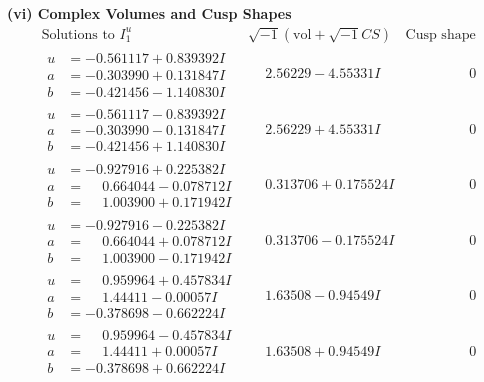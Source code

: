 \documentclass[1p]{elsarticle_modified}
\theoremstyle{definition}
\newcommand{\I}{\sqrt{-1}}
\begin{document}
\newpage\flushleft \textbf{(vi) Complex Volumes and Cusp Shapes}
$$\begin{array}{c|c|c}  
\text{Solutions to }I^u_{1}& \I (\text{vol} + \sqrt{-1}CS) & \text{Cusp shape}\\
 \hline 
\begin{aligned}
u &= -0.561117 + 0.839392 I \\
a &= -0.303990 + 0.131847 I \\
b &= -0.421456 - 1.140830 I\end{aligned}
 & \phantom{-}2.56229 - 4.55331 I & \phantom{-0.000000 } 0 \\ \hline\begin{aligned}
u &= -0.561117 - 0.839392 I \\
a &= -0.303990 - 0.131847 I \\
b &= -0.421456 + 1.140830 I\end{aligned}
 & \phantom{-}2.56229 + 4.55331 I & \phantom{-0.000000 } 0 \\ \hline\begin{aligned}
u &= -0.927916 + 0.225382 I \\
a &= \phantom{-}0.664044 - 0.078712 I \\
b &= \phantom{-}1.003900 + 0.171942 I\end{aligned}
 & \phantom{-}0.313706 + 0.175524 I & \phantom{-0.000000 } 0 \\ \hline\begin{aligned}
u &= -0.927916 - 0.225382 I \\
a &= \phantom{-}0.664044 + 0.078712 I \\
b &= \phantom{-}1.003900 - 0.171942 I\end{aligned}
 & \phantom{-}0.313706 - 0.175524 I & \phantom{-0.000000 } 0 \\ \hline\begin{aligned}
u &= \phantom{-}0.959964 + 0.457834 I \\
a &= \phantom{-}1.44411 - 0.00057 I \\
b &= -0.378698 - 0.662224 I\end{aligned}
 & \phantom{-}1.63508 - 0.94549 I & \phantom{-0.000000 } 0 \\ \hline\begin{aligned}
u &= \phantom{-}0.959964 - 0.457834 I \\
a &= \phantom{-}1.44411 + 0.00057 I \\
b &= -0.378698 + 0.662224 I\end{aligned}
 & \phantom{-}1.63508 + 0.94549 I & \phantom{-0.000000 } 0 \\ \hline\begin{aligned}

\end{aligned}
\end{array}$$
\end{document}
